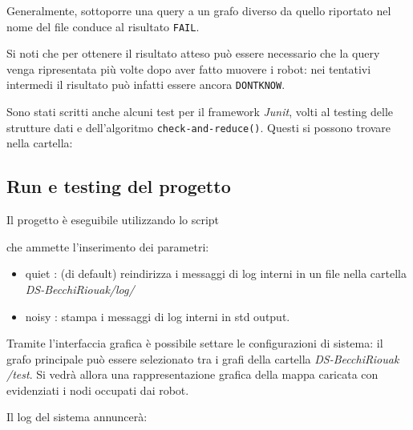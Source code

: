 Generalmente, sottoporre una query a un grafo diverso da quello riportato
nel nome del file conduce al risultato \texttt{FAIL}.

Si noti che per ottenere il risultato atteso può essere necessario
che la query venga ripresentata più volte dopo aver fatto muovere i robot:
nei tentativi intermedi il risultato può infatti essere ancora \texttt{DONTKNOW}.

Sono stati scritti anche alcuni test per il framework \emph{Junit}, volti al
testing delle strutture dati e dell'algoritmo \texttt{check-and-reduce()}.
Questi si possono trovare nella cartella:\\

\subsection{Run e testing del progetto}
Il progetto è eseguibile utilizzando lo script


che ammette l'inserimento dei parametri:
\begin{itemize}
\item quiet : (di default) reindirizza i messaggi di log interni in un file nella
  cartella \emph{DS-BecchiRiouak/log/ }
\item noisy : stampa i messaggi di log interni in std output.
\end{itemize}

Tramite l'interfaccia grafica è possibile settare le configurazioni di sistema:
il grafo principale può essere selezionato tra i grafi della cartella
\emph{DS-BecchiRiouak /test}.
Si vedrà allora una rappresentazione grafica della mappa caricata con
evidenziati i nodi occupati dai robot.

Il log del sistema annuncerà:




